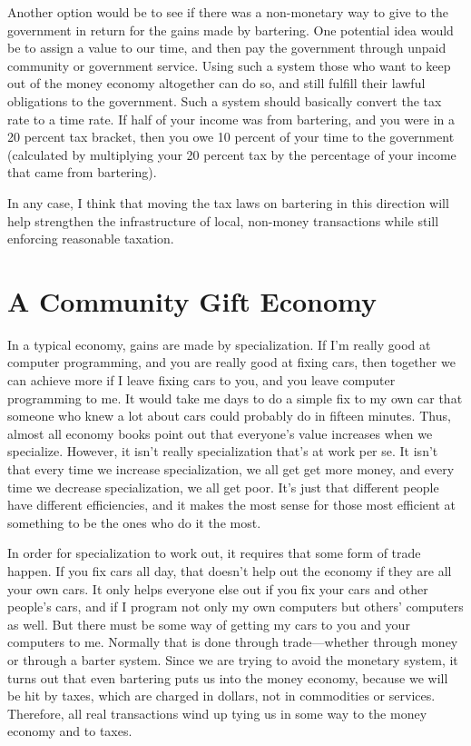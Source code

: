 \begin{policynote}
Another option would be to see if there was a non-monetary way to give to the government in return
for the gains made by bartering.  One potential idea would be to assign a value to our time, and 
then pay the government through unpaid community or government service.  Using such a system those
who want to keep out of the money economy altogether can do so, and still fulfill their lawful
obligations to the government.  Such a system should basically convert the tax rate to a time rate. 
If half of your income was from bartering, and you were in a 20 percent tax bracket, then you owe 10 percent
of your time to the government (calculated by multiplying your 20 percent tax by the percentage of your income that came from bartering).

In any case, I think that moving the tax laws on bartering in this
direction will help strengthen the infrastructure of local, non-money transactions while still
enforcing reasonable taxation.
\end{policynote}

\section{A Community Gift Economy}

In a typical economy, gains are made by specialization. If I’m really
good at computer programming, and you are really good at fixing cars,
then together we can achieve more if I leave fixing cars to you, and
you leave computer programming to me. It would take me days to do a
simple fix to my own car that someone who knew a lot about cars could
probably do in fifteen minutes. Thus, almost all economy books point
out that everyone’s value increases when we specialize. However, it
isn’t really specialization that’s at work per se. 
It isn’t that every time we
increase specialization,
we all get
get more money, and
every time we decrease specialization, we all get poor. It’s just that
different people have different efficiencies, and it makes the most
sense for those most efficient at something to be the ones who do it
the most.

In order for specialization to work out, it requires that some form of
trade happen. If you fix cars all day, that doesn’t help out the
economy if they are all your own cars. It only helps everyone else out
if you fix your cars and other people’s cars, and if I program not only
my own computers but others’ computers as well. But there must be some
way of getting my cars to you and your computers to me. Normally that
is done through trade---whether through money or through a barter system.
Since we are trying to avoid the monetary system, it turns out that
even bartering puts us into the money economy, because we will be hit
by taxes, which are charged in dollars, not in commodities or services.
Therefore, all real transactions wind up tying us in some way to the
money economy and to taxes.

